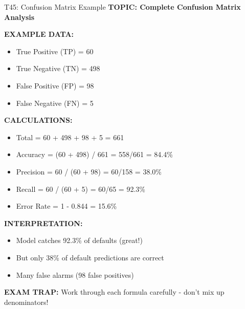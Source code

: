 \documentclass[8pt]{beamer}
\begin{document}
	\begin{frame}{T45: Confusion Matrix Example}
		\fontsize{6.5}{7.5}\selectfont
		\textbf{TOPIC: Complete Confusion Matrix Analysis}
		
		\vspace{0.1cm}
		\textbf{EXAMPLE DATA:}
		\begin{itemize}
			\item True Positive (TP) = 60
			\item True Negative (TN) = 498
			\item False Positive (FP) = 98
			\item False Negative (FN) = 5
		\end{itemize}
		
		\vspace{0.1cm}
		\textbf{CALCULATIONS:}
		\begin{itemize}
			\item Total = 60 + 498 + 98 + 5 = 661
			\item Accuracy = (60 + 498) / 661 = 558/661 = 84.4\%
			\item Precision = 60 / (60 + 98) = 60/158 = 38.0\%
			\item Recall = 60 / (60 + 5) = 60/65 = 92.3\%
			\item Error Rate = 1 - 0.844 = 15.6\%
		\end{itemize}
		
		\vspace{0.1cm}
		\textbf{INTERPRETATION:}
		\begin{itemize}
			\item Model catches 92.3\% of defaults (great!)
			\item But only 38\% of default predictions are correct
			\item Many false alarms (98 false positives)
		\end{itemize}
		
		\textcolor{myred}{\textbf{EXAM TRAP:}} Work through each formula carefully - don't mix up denominators!
	\end{frame}
	
	
\end{document}
